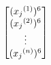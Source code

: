 \documentclass[preview]{standalone}
\begin{document}
\begin{align*}
\special{dvisvgm:raw <g id='unique000'>}\begin{bmatrix}({x_j}^{(1)})^6\\({x_j}^{(2)})^6\\ \vdots \\({x_j}^{(n)})^6\end{bmatrix}\special{dvisvgm:raw </g>}
\end{align*}
\end{document}
